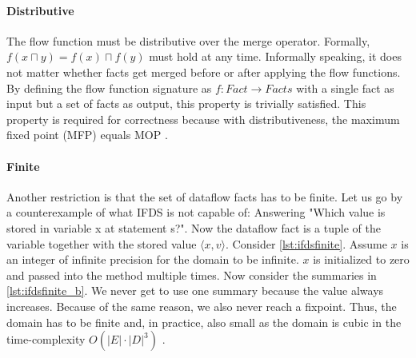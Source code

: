 \documentclass[../draft.tex]{subfiles}
\begin{document}
    \paragraph{Distributive} The flow function must be distributive over the merge operator. Formally, $f(x \sqcap y) = f(x) \sqcap f(y)$ must hold at any time. Informally speaking, it does not matter whether facts get merged before or after applying the flow functions. By defining the flow function signature as $f: \mathit{Fact} \rightarrow \mathit{Facts}$ with a single fact as input but a set of facts as output, this property is trivially satisfied. This property is required for correctness because with distributiveness, the maximum fixed point (MFP) equals MOP \cite{Khedker2009,Reps1995}.

    \paragraph{Finite} Another restriction is that the set of dataflow facts has to be finite. Let us go by a counterexample of what IFDS is not capable of: Answering "Which value is stored in variable x at statement s?".
    Now the dataflow fact is a tuple of the variable together with the stored value $\langle x, v \rangle$. Consider \autoref{lst:ifdsfinite}. Assume $x$ is an integer of infinite precision for the domain to be infinite.
    $x$ is initialized to zero and passed into the method  multiple times. Now consider the summaries in \autoref{lst:ifdsfinite_b}. We never get to use one summary because the value always increases. Because of the same reason, we also never reach a fixpoint. Thus, the domain has to be finite and, in practice, also small as the domain is cubic in the time-complexity $O(|E| \cdot |D|^3)$  \cite{Reps1995}.
    
\end{document}
